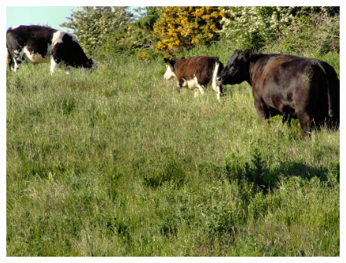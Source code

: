 \documentclass[a4paper, 10pt]{article}
\begin{document}
\begin{figure}
\begin{minipage}{.4\textwidth}
\includegraphics[scale=0.25]{inpainted/perfect-cow.png}
\end{minipage}%
\end{figure}
\end{document}
